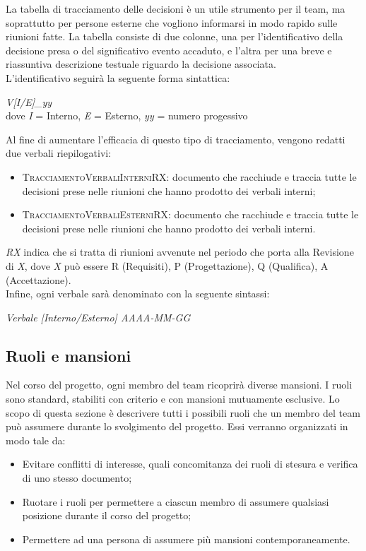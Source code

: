 			La tabella di tracciamento delle decisioni è un utile strumento per il team, ma soprattutto per persone esterne che vogliono informarsi in modo rapido sulle riunioni fatte.
			La tabella consiste di due colonne, una per l'identificativo della decisione presa o del significativo evento accaduto, e l'altra per una breve e riassuntiva descrizione testuale riguardo la decisione associata.\\
			L'identificativo seguirà la seguente forma sintattica:
			\begin{center}
				\textit{V[I/E]\_yy} \\\vspace{0.2cm}dove \textit{I} = Interno, \textit{E} = Esterno, \textit{yy} = numero progessivo
			\end{center}
			Al fine di aumentare l'efficacia di questo tipo di tracciamento, vengono redatti due verbali riepilogativi:
			\begin{itemize}
				\item \textsc{TracciamentoVerbaliInterniRX:} documento che racchiude e traccia tutte le decisioni prese nelle riunioni che hanno prodotto dei verbali interni;
				\item\textsc{TracciamentoVerbaliEsterniRX:} documento che racchiude e traccia tutte le decisioni prese nelle riunioni che hanno prodotto dei verbali interni.
			\end{itemize}
			\textit{RX} indica che si tratta di riunioni avvenute nel periodo che porta alla Revisione di \textit{X}, dove \textit{X} può essere R (Requisiti), P (Progettazione), Q (Qualifica), A (Accettazione).\\
			Infine, ogni verbale sarà denominato con la seguente sintassi:
			\begin{center}
				\textit{Verbale [Interno/Esterno] AAAA-MM-GG}
			\end{center} 
	
	\newpage	
	\subsection{Ruoli e mansioni}
	Nel corso del progetto, ogni membro del team ricoprirà diverse mansioni. I ruoli sono standard, stabiliti con criterio e con mansioni mutuamente esclusive. Lo scopo di questa sezione è descrivere tutti i possibili ruoli che un membro del team può assumere durante lo svolgimento del progetto. Essi verranno organizzati in modo tale da:
	\begin{itemize}
		\item Evitare conflitti di interesse, quali concomitanza dei ruoli di stesura e verifica di uno stesso documento;
		\item Ruotare i ruoli per permettere a ciascun membro di assumere qualsiasi posizione durante il corso del progetto;
		\item Permettere ad una persona di assumere più mansioni contemporaneamente.
	\end{itemize}

